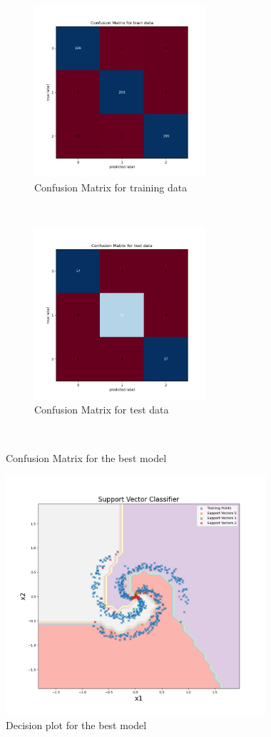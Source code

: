 
\begin{figure}[!ht]
    \centering
    \begin{subfigure}[t]{0.5\textwidth}
        \centering
        \includegraphics[height=2.5in]{Dataset_1b/SVM/SVC_poly_cmatrix_train_data.png}
        \caption{Confusion Matrix for training data}
    \end{subfigure}%
    ~ 
    \begin{subfigure}[t]{0.5\textwidth}
        \centering
        \includegraphics[height=2.5in]{Dataset_1b/SVM/SVC_poly_cmatrix_test_data.png}
        \caption{Confusion Matrix for test data}
    \end{subfigure}%
    ~
    \caption{Confusion Matrix for the best model}
    \label{fig:13}
\end{figure}

\begin{figure}[!ht]
    \centering
    \includegraphics[height=3.5in]{Dataset_1b/SVM/SVC_Poly.png}
    \caption{Decision plot for the best model}
    \label{fig:14}
\end{figure}

